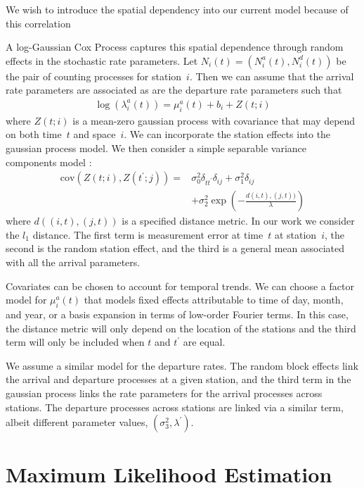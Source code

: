 \documentclass{acm_proc_article-sp}
\begin{document}
We wish to introduce the spatial dependency into our current model because of this correlation 

A log-Gaussian Cox Process captures this spatial dependence through random effects in the stochastic rate parameters.  Let $N_i (t) = (N_i^{a} (t), N_i^{d} (t))$ be the pair of counting processes for station~$i$.  Then we can assume that the arrival rate parameters are associated as are the departure rate parameters such that
\begin{align}
\log \left( \lambda_i^{a} (t) \right) = \mu^{a}_i(t) + b_i + Z(t;i)
\end{align}
\noindent where $Z(t;i)$ is a mean-zero gaussian process with covariance that may depend on both time~$t$ and space~$i$.  We can incorporate the station effects into the gaussian process model.  We then consider a simple separable variance components model :
\begin{align*}
\text{cov} ( Z(t;i) , Z(t^\prime; j) ) =& \sigma_0^2 \delta_{t t^\prime}  \delta_{i j} + \sigma_1^2  \delta_{i j} \\
&+ \sigma_2^2 \exp \left( -\frac{ d(i,t),(j,t)) }{\lambda} \right)
\end{align*}
\noindent where $d ( (i,t) , (j,t))$ is a specified distance metric. In our work we consider the $l_1$ distance.  The first term is measurement error at time~$t$ at station~$i$, the second is the random station effect, and the third is a general mean associated with all the arrival parameters.

Covariates can be chosen to account for temporal trends.  We can choose a factor model for $\mu_i^{a} (t)$ that models fixed effects attributable to time of day, month, and year, or a basis expansion in terms of low-order Fourier terms.  In this case, the distance metric will only depend on the location of the stations and the third term will only be included when $t$ and $t^\prime$ are equal.

We assume a similar model for the departure rates.  The random block effects link the arrival and departure processes at a given station, and the third term in the gaussian process links the rate parameters for the arrival processes across stations.  The departure processes across stations are linked via a similar term, albeit different parameter values, $(\sigma_3^2, \lambda^\prime)$.

\section{Maximum Likelihood Estimation}
\end{document}
